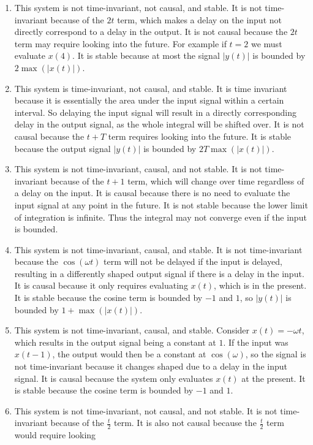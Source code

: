 \documentclass[12pt]{article}
\begin{document}
\begin{enumerate}
    \item This system is not time-invariant, not causal, and stable. It is not time-invariant because of the \(2t\) term, which makes a delay on the input not directly correspond to a delay in the output.
    It is not causal because the \(2t\) term may require looking into the future. For example if \(t=2\) we must evaluate \(x(4)\). It is stable because at most the signal \(|y(t)|\) is bounded by
    \(2\max(|x(t)|)\).
    \item This system is time-invariant, not causal, and stable. It is time invariant because it is essentially the area under the input signal within a certain interval. So delaying the input signal will result
    in a directly corresponding delay in the output signal, as the whole integral will be shifted over. It is not causal because the \(t+T\) term requires looking into the future. It is stable because
    the output signal \(|y(t)|\) is bounded by \(2T\max(|x(t)|)\).
    \item This system is not time-invariant, causal, and not stable. It is not time-invariant because of the \(t+1\) term, which will change over time regardless of a delay on the input. It is causal
    because there is no need to evaluate the input signal at any point in the future. It is not stable because the lower limit of integration is infinite. Thus the integral may not converge even if the input
    is bounded.
    \item This system is not time-invariant, causal, and stable. It is not time-invariant because the \(\cos(\omega t)\) term will not be delayed if the input is delayed, resulting in a differently shaped
    output signal if there is a delay in the input. It is causal because it only requires evaluating \(x(t)\), which is in the present. It is stable because the cosine term is bounded by \(-1\) and \(1\),
    so \(|y(t)|\) is bounded by \(1+\max(|x(t)|)\).
    \item This system is not time-invariant, causal, and stable. Consider \(x(t)=-\omega t\), which results in the output signal being a constant at \(1\). If the input was \(x(t-1)\), the output would then be a
    constant at \(\cos(\omega)\), so the signal is not time-invariant because it changes shaped due to a delay in the input signal. It is causal because the system only evaluates \(x(t)\) at the present. It is
    stable because the cosine term is bounded by \(-1\) and \(1\).
    \item This system is not time-invariant, not causal, and not stable. It is not time-invariant because of the \(\frac{t}{2}\) term. It is also not causal because the \(\frac{t}{2}\) term would require looking

\end{enumerate}
\end{document}

